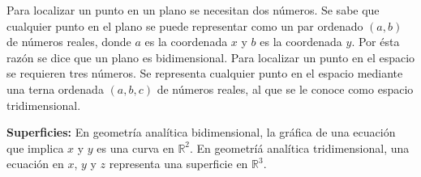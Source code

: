 Para localizar un punto en un plano se necesitan dos números. Se sabe que cualquier punto en el plano se puede representar como un par ordenado ${(a,b)}$ de números reales, donde ${a}$ es la coordenada ${x}$ y ${b}$ es la coordenada ${y}$. Por ésta razón se dice que un plano es bidimensional. Para localizar un punto en el espacio se requieren tres números. Se representa cualquier punto en el espacio mediante una terna ordenada ${(a, b, c)}$ de números reales, al que se le conoce como espacio tridimensional.

\vspace{4mm}
\textbf{Superficies:} En geometría analítica bidimensional, la gráfica de una ecuación que implica ${x}$ y ${y}$ es una curva en ${\mathbb{R}^{2}}$. En geometríá analítica tridimensional, una ecuación en ${x}$, ${y}$ y ${z}$ representa una superficie en ${\mathbb{R}^{3}}$. 

\label{espacio_tridimensional}
